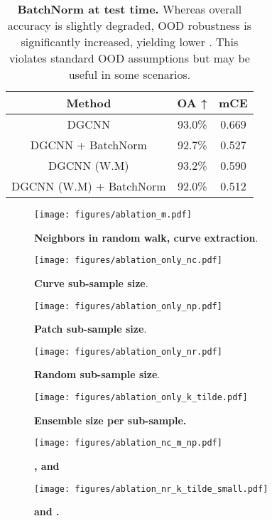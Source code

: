 \documentclass[10pt,twocolumn]{article}
\begin{document}
\begin{table*}
  \centering
  \begin{tabular}{c | c | c}
    \hline
    Method & OA ↑ & mCE \\
    \hline
    DGCNN & 93.0\% & 0.669\\
    DGCNN + BatchNorm & 92.7\% & 0.527\\
    \hline
    DGCNN (W.M) & 93.2\% & 0.590\\
    DGCNN (W.M) + BatchNorm & 92.0\% & 0.512\\
    \hline
  \end{tabular}
  \caption{{\bf BatchNorm at test time.} Whereas overall accuracy is slightly degraded, OOD robustness is significantly increased, yielding lower . This violates standard OOD assumptions but may be useful in some scenarios.}
  \label{table:batchnorm}
\end{table*}

\begin{figure*}
 \centering
  
  \texttt{[image: figures/ablation\_m.pdf]}
  \caption{{\bf Neighbors in random walk, curve extraction}.}
  \label{fig:ablation_m}
\end{figure*}
\begin{figure*}
 \centering
  \texttt{[image: figures/ablation\_only\_nc.pdf]}
  \caption{{\bf Curve sub-sample size}.}
  \label{fig:ablation_only_nc}
\end{figure*}
\begin{figure*}
 \centering
  \texttt{[image: figures/ablation\_only\_np.pdf]}
  \caption{{\bf Patch sub-sample size}.}
  \label{fig:ablation_only_np}
\end{figure*}
\begin{figure*}
 \centering
  \texttt{[image: figures/ablation\_only\_nr.pdf]}
  \caption{{\bf Random sub-sample size}.}
  \label{fig:ablation_only_nr}
\end{figure*}
\begin{figure*}
 \centering
  \texttt{[image: figures/ablation\_only\_k\_tilde.pdf]}
  \caption{{\bf Ensemble size per sub-sample.
}}
  \label{fig:ablation_only_k_tilde}
\end{figure*}


\begin{figure*}
  \centering
\texttt{[image: figures/ablation\_nc\_m\_np.pdf]}

   \caption{\bf{,  and }} 
   \label{fig:ablation_nc_m_np}
\end{figure*}
\begin{figure*}
  \centering
\texttt{[image: figures/ablation\_nr\_k\_tilde\_small.pdf]}

   \caption{\bf{ and .}} 
   \label{fig:ablation_nr_k_tilde}
\end{figure*}
\end{document}
